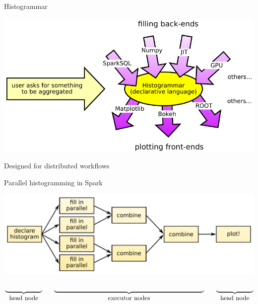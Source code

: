 \documentclass[aspectratio=169]{beamer}
\begin{document}
\begin{frame}{Histogrammar}
\vspace{0.5 cm}
\begin{center}
\includegraphics[width=0.9\linewidth]{front-back-ends.pdf}
\end{center}
\end{frame}

\begin{frame}{Designed for distributed workflows}
\vspace{0.5 cm}
\begin{block}{Parallel histogramming in Spark}
\end{block}

\includegraphics[width=\linewidth]{parallelization.pdf}

\vspace{-1 cm}
\[ \underbrace{\mbox{\hspace{2 cm}}}_{\mbox{head node}} \hspace{0.6 cm} \underbrace{\mbox{\hspace{8.125 cm}}}_{\mbox{executor nodes}} \hspace{0.625 cm} \underbrace{\mbox{\hspace{2 cm}}}_{\mbox{head node}} \]

\end{frame}
\end{document}
